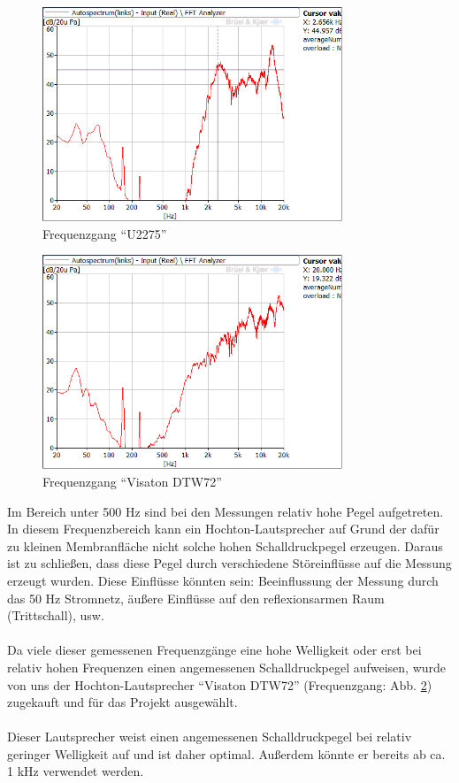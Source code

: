 \begin{figure} [H]
	\centering
	\includegraphics[width=0.8\textwidth]{img/LSMessung/HT/U2275_1m_erhoeht.png}
	\caption{Frequenzgang \enquote{U2275}}
	\label{fig:4.3.5}
\end{figure}

\begin{figure} [H]
	\centering
	\includegraphics[width=0.8\textwidth]{img/LSMessung/HT/VisatonDTW72.png}
	\caption{Frequenzgang \enquote{Visaton DTW72}}
	\label{fig:4.3.6}
\end{figure}
\newpage
Im Bereich unter 500 Hz sind bei den Messungen relativ hohe Pegel aufgetreten.
In diesem Frequenzbereich kann ein Hochton-Lautsprecher auf Grund der dafür zu kleinen Membranfläche nicht solche hohen Schalldruckpegel erzeugen.
Daraus ist zu schließen, dass diese Pegel durch verschiedene Störeinflüsse auf die Messung erzeugt wurden.
Diese Einflüsse könnten sein: Beeinflussung der Messung durch das 50 Hz Stromnetz, äußere Einflüsse auf den reflexionsarmen Raum (Trittschall), usw.
\\ \\
Da viele dieser gemessenen Frequenzgänge eine hohe Welligkeit oder erst bei relativ hohen Frequenzen einen angemessenen Schalldruckpegel aufweisen, wurde von uns der Hochton-Lautsprecher \enquote{Visaton DTW72} (Frequenzgang: Abb. \ref{fig:4.3.6}) zugekauft und für das Projekt ausgewählt.
\\ \\
Dieser Lautsprecher weist einen angemessenen Schalldruckpegel bei relativ geringer Welligkeit auf und ist daher optimal.
Außerdem könnte er bereits ab ca. 1 kHz verwendet werden.

